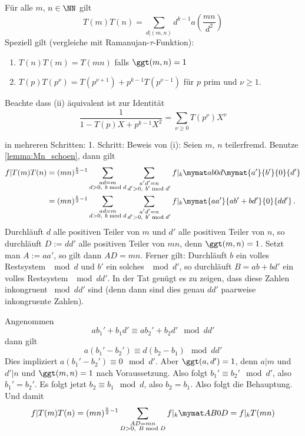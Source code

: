\begin{satz}
Für alle $m$, $n \in \NN$ gilt
\[
	T(m) T(n) = \sum_{d | (m,n)} d^{k-1} a \left( \frac {mn}{d^2} \right)
\]
Speziell gilt (vergleiche mit Ramanujan-$\tau$-Funktion):
\begin{enumerate}
	\item $T(n)T(m) = T(mn)$ falls $\ggt(m,n) = 1$
	\item $T(p) T(p^\nu) = T(p^{\nu+1}) + p^{k-1} T(p^{\nu-1})$ für $p$ prim und $\nu \geq 1$.
\end{enumerate}

Beachte dass (ii) äquivalent ist zur Identität
\[
	\frac{1}{1-T(p)X+p^{k-1}X^2} = \sum_{\nu \geq 0} T(p^\nu) X^\nu
\]
\end{satz}

\begin{bewe}
	in mehreren Schritten:
	1. Schritt: Beweis von (i):
	Seien $m$, $n$ teilerfremd.
	Benutze \autoref{lemma:Mn_schoen}, dann gilt
	\begin{align*}
		f|T(m)T(n)
		&= (mn)^{\frac{k}{2}-1} \sum_{\substack{ad=m \\ d>0,\ b\bmod d}} \sum_{\substack{a'd' = n\\ d'>0,\ b' \bmod d'}} f|_k \mymat ab0d \mymat{a'}{b'}{0}{d'} \\
		&= (mn)^{\frac{k}{2}-1} \sum_{\substack{ad=m \\ d>0,\ b\bmod d}} \sum_{\substack{a'd' = n\\ d'>0,\ b' \bmod d'}} f|_k \mymat{aa'}{ab'+bd'}{0}{dd'}
		\,.
	\end{align*}
	Durchläuft $d$ alle positiven Teiler von $m$ und $d'$ alle positiven Teiler von $n$, so durchläuft $D := dd'$ alle positiven Teiler von $mn$, denn $\ggt(m, n) = 1$.
	Setzt man $A := aa'$, so gilt dann $AD = mn$.
	Ferner gilt: Durchläuft $b$ ein volles Restsystem $\mod d$ und $b'$ ein solches $\mod d'$, so durchläuft $B = ab+bd'$ ein volles Restsystem $\mod dd'$.
	In der Tat genügt es zu zeigen, dass diese Zahlen inkongruent $\bmod dd'$ sind (denn dann sind dies genau $dd'$ paarweise inkongruente Zahlen).
	
	Angenommen
	\[
		ab_1' + b_1d' \equiv ab_2' +b_2d' \mod dd'
	\]
	dann gilt
	\[
		a(b_1' - b_2') \equiv d(b_2 - b_1) \mod dd'
	\]
	Dies impliziert $a(b_1'- b_2') \equiv 0 \mod d'$. Aber $\ggt(a, d') = 1$, denn $a|m$ und $d'|n$ und $\ggt(m, n) = 1$ nach Voraussetzung.
	Also folgt $b_1' \equiv b_2' \mod d'$, also $b_1' = b_2'$.
	Es folgt jetzt $b_2 \equiv b_1 \mod d$, also $b_2 = b_1$.
	Also folgt die Behauptung.
	Und damit
	\[
		f|T(m)T(n)
		= (mn)^{\frac{k}{2}-1} \sum_{\substack{AD = mn\\ D > 0,\ B \bmod D}} f|_k \mymat AB0D
		= f|_kT(mn)
	\]
	

\end{bewe}
